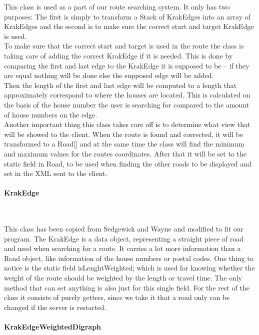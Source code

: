 \documentclass[a4paper,10pt,titlepage]{article}
\begin{document}
This class is used as a part of our route searching system. It only has two purposes: The first is simply to transform a Stack of KrakEdges into an array of KrakEdges and the second is to make sure the correct start and target KrakEdge is used.\\
To make sure that the correct start and target is used in the route the class is taking care of adding the correct KrakEdge if it is needed. This is done by comparing the first and last edge to the KrakEdge it is supposed to be – if they are equal nothing will be done else the supposed edge will be added.\\
Then the length of the first and last edge will be computed to a length that approximately correspond to where the houses are located. This is calculated on the basis of the house number the user is searching for compared to the amount of house numbers on the edge.\\
Another important thing this class takes care off is to determine what view that will be showed to the client. When the route is found and corrected, it will be transformed to a Road[] and at the same time the class will find the minimum and maximum values for the routes coordinates. After that it will be set to the static field in Road, to be used when finding the other roads to be displayed and set in the XML sent to the client.\\


				
				\paragraph{KrakEdge \cite{sedgewickAndWayneDirectedEdge}}\mbox{}\
				

This class has been copied from Sedgewick and Wayne and modified to fit our program. The KrakEdge is a data object, representing a straight piece of road and used when searching for a route. It carries a lot more information than a Road object, like information of the house numbers or postal codes. One thing to notice is the static field isLenghtWeighted; which is used for knowing whether the weight of the route should be weighted by the length or travel time. The only method that can set anything is also just for this single field. For the rest of the class it consists of purely getters, since we take it that a road only can be changed if the server is restarted.\\


				
				\paragraph{KrakEdgeWeightedDigraph \cite{sedgewickAndWayneEdgeWeightedDigraph}}\mbox{}\
				
\end{document}
